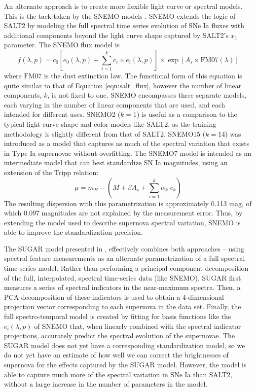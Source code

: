 An alternate approach is to create more flexible light curve or spectral models. This is the tack taken by the SNEMO models \citep{saunders_snemo_2018}. SNEMO extends the logic of SALT2 by modeling the full spectral time series evolution of SNe Ia fluxes with additional components beyond the light curve shape captured by SALT2's $x_1$ parameter. The SNEMO flux model is
\begin{equation}
    f(\lambda, p) = c_0\left[e_0(\lambda, p) + \displaystyle\sum_{i=1}^k c_i\times e_i(\lambda, p)\right] \times \exp\left[A_s\times \textrm{FM07}(\lambda)\right]
\end{equation}
where $\textrm{FM07}$ is the \citet{fitzpatrick_analysis_2007} dust extinction law. The functional form of this equation is quite similar to that of Equation \ref{eqn:salt_flux}, however the number of linear components, $k$, is not fixed to one. SNEMO encompasses three separate models, each varying in the number of linear components that are used, and each intended for different uses. SNEMO2 ($k=1$) is useful as a comparison to the typical light curve shape and color models like SALT2, as the training methodology is slightly different from that of SALT2. SNEMO15 ($k=14$) was introduced as a model that captures as much of the spectral variation that exists in Type Ia supernovae without overfitting. The SNEMO7 model is intended as an intermediate model that can best standardize SN Ia magnitudes, using an extension of the Tripp relation:
\begin{equation}
    \mu = m_B - \left(M + \beta A_s + \displaystyle\sum_{i=1}^k \alpha_k \; c_k\right)
\end{equation}
The resulting dispersion with this parametrization is approximately 0.113 mag, of which 0.097 magnitudes are not explained by the measurement error. Thus, by extending the model used to describe supernova spectral variation, SNEMO is able to improve the standardization precision.

The SUGAR model presented in \citet{leget_sugar_2020}, effectively combines both approaches -- using spectral feature measurements as an alternate parametrization of a full spectral time-series model. Rather than performing a principal component decomposition of the full, interpolated, spectral time-series data (like SNEMO), SUGAR first measures a series of spectral indicators in the near-maximum spectra. Then, a PCA decomposition of these indicators is used to obtain a 4-dimensional projection vector corresponding to each supernova in the data set. Finally, the full spectro-temporal model is created by fitting for basis functions like the $e_i(\lambda, p)$ of SNEMO that, when linearly combined with the spectral indicator projections, accurately predict the spectral evolution of the supernovae. The SUGAR model does not yet have a corresponding standardization model, so we do not yet have an estimate of how well we can correct the brightnesses of supernova for the effects captured by the SUGAR model. However, the model is able to capture much more of the spectral variation in SNe Ia than SALT2, without a large increase in the number of parameters in the model.


